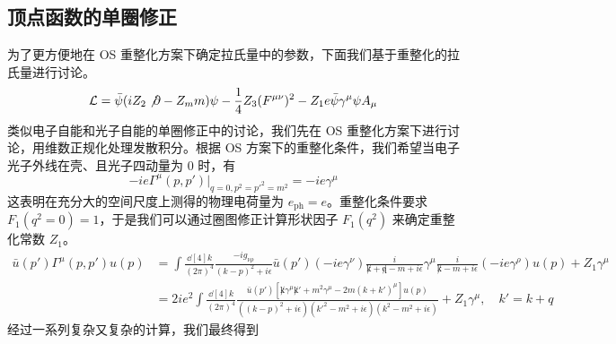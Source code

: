 \subsection{顶点函数的单圈修正}
为了更方便地在 OS 重整化方案下确定拉氏量中的参数，下面我们基于重整化的拉氏量进行讨论。
\begin{equation}
\mathcal{L}=\bar\psi (iZ_2\not\partial - Z_m m)\psi - \frac{1}{4}Z_3 (F^{\mu\nu})^2-Z_1 e \bar\psi \gamma^\mu\psi A_\mu
\end{equation}
类似电子自能和光子自能的单圈修正中的讨论，我们先在 OS 重整化方案下进行讨论，用维数正规化处理发散积分。根据 OS 方案下的重整化条件，我们希望当电子光子外线在壳、且光子四动量为 $0$ 时，有
\begin{equation}
-ie\Gamma^\mu(p,p')|_{q=0,p^2={p'}^2=m^2} = -ie\gamma^\mu
\end{equation}
这表明在充分大的空间尺度上测得的物理电荷量为 $e_{\text{ph}}=e$。重整化条件要求 $F_1(q^2=0)=1$，于是我们可以通过圈图修正计算形状因子 $F_1(q^2)$ 来确定重整化常数 $Z_1$。
\begin{equation}
\begin{aligned}
\bar u(p')\Gamma^\mu(p,p')u(p) &=\int\frac{\dd[4]{k}}{(2\pi)^4} \frac{-i g_{\nu\rho}}{(k-p)^2+i\epsilon} \bar u(p')(-ie\gamma^\nu)\frac{i}{\not k+\not q-m+i\epsilon}\gamma^\mu \frac{i}{\not k-m+i\epsilon} (-ie\gamma^\rho) u(p)
+Z_1\gamma^\mu\\
&=2ie^2\int\frac{\dd[4]{k}}{(2\pi)^4} \frac{\bar u(p') [\not k \gamma^\mu \not k'+m^2\gamma^\mu - 2m(k+k')^\mu]u(p)}{((k-p)^2+i\epsilon)({k'}^2-m^2+i\epsilon)(k^2-m^2+i\epsilon)} + Z_1 \gamma^\mu,\quad k' = k+q
\end{aligned}
\end{equation}
经过一系列复杂又复杂的计算，我们最终得到

